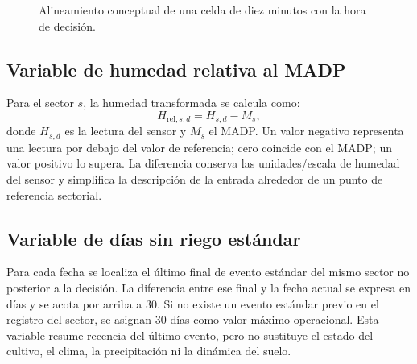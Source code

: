\documentclass[11pt,letterpaper]{article}
\begin{document}
\begin{figure}[H]
\centering
{}
\caption{Alineamiento conceptual de una celda de diez minutos con la hora de decisión.}\label{fig:alineamiento-sensor}
\end{figure}

\subsection{Variable de humedad relativa al MADP}
Para el sector $s$, la humedad transformada se calcula como:
\begin{equation}
  H_{\mathrm{rel},s,d}=H_{s,d}-M_s,
  \label{eq:humedad-rel}
\end{equation}
donde $H_{s,d}$ es la lectura del sensor y $M_s$ el MADP. Un valor negativo representa una lectura por debajo del valor de referencia; cero coincide con el MADP; un valor positivo lo supera. La diferencia conserva las unidades/escala de humedad del sensor y simplifica la descripción de la entrada alrededor de un punto de referencia sectorial.

\subsection{Variable de días sin riego estándar}
Para cada fecha se localiza el último final de evento estándar del mismo sector no posterior a la decisión. La diferencia entre ese final y la fecha actual se expresa en días y se acota por arriba a 30. Si no existe un evento estándar previo en el registro del sector, se asignan 30 días como valor máximo operacional. Esta variable resume recencia del último evento, pero no sustituye el estado del cultivo, el clima, la precipitación ni la dinámica del suelo.
\end{document}
